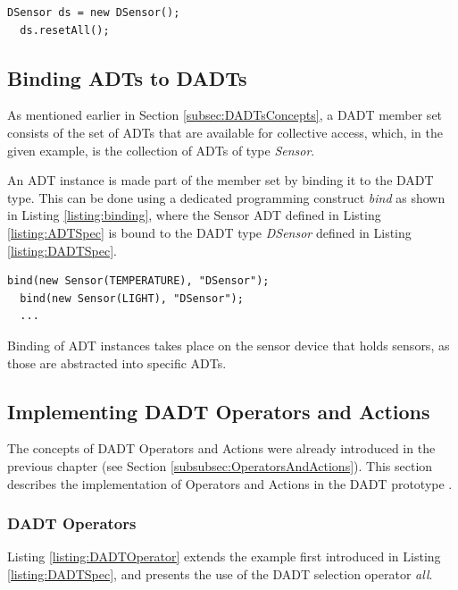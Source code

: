 \begin{lstlisting}[frame=trbl, basewidth={0.55em, 0.6em}, captionpos=b, 
basicstyle=\ttfamily\footnotesize, breaklines, caption = DADT Instantiation 
(reproduced from \cite{migliavacca_DADT:2006}), label = listing:DADTInstance ]
  DSensor ds = new DSensor();
  ds.resetAll();
\end{lstlisting}

\subsection{Binding ADTs to DADTs}

As mentioned earlier in Section \ref{subsec:DADTsConcepts}, a DADT member set
consists of the set of ADTs that are available for collective
access, which, in the given example, is the collection of ADTs of type \emph{Sensor}.

An ADT instance is made part of the member set by binding it to the DADT type.
This can be done using a dedicated programming construct \emph{bind} as shown in
Listing \ref{listing:binding}, where the Sensor ADT defined in Listing
\ref{listing:ADTSpec} is bound to the DADT type \emph{DSensor} defined in Listing \ref{listing:DADTSpec}.
 
\begin{lstlisting}[frame=trbl, basewidth={0.55em, 0.6em}, captionpos=b, 
basicstyle=\ttfamily\footnotesize, breaklines, caption = Binding ADT instances to a DADT instance, label = listing:binding]
  bind(new Sensor(TEMPERATURE), "DSensor");
  bind(new Sensor(LIGHT), "DSensor");
  ...
\end{lstlisting} 

Binding of ADT instances takes place on the sensor device that holds sensors,
as those are abstracted into specific ADTs.

\subsection{Implementing DADT Operators and Actions}
\label{subsubsec:OperatorsAndActionsImpl}

The concepts of DADT Operators and Actions were already introduced in the
previous chapter (see Section \ref{subsubsec:OperatorsAndActions}). This
section describes the implementation of Operators and Actions in the DADT
prototype \cite{migliavacca_DADT:2006}.

\subsubsection{DADT Operators}
Listing \ref{listing:DADTOperator} extends the example first introduced in
Listing \ref{listing:DADTSpec}, and presents the use of the DADT selection
operator \emph{all}.

